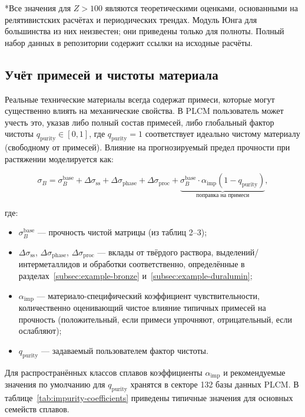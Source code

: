 \documentclass[12pt,a4paper]{article}
\begin{document}
	*Все значения для \(Z>100\) являются теоретическими оценками, основанными на релятивистских расчётах и периодических трендах. Модуль Юнга для большинства из них неизвестен; они приведены только для полноты. Полный набор данных в репозитории содержит ссылки на исходные расчёты.
	
	\subsection{Учёт примесей и чистоты материала}
	\label{subsec:purity}
	
	Реальные технические материалы всегда содержат примеси, которые могут существенно влиять на механические свойства. В PLCM пользователь может учесть это, указав либо полный состав примесей, либо глобальный фактор чистоты \(q_{\mathrm{purity}} \in [0,1]\), где \(q_{\mathrm{purity}}=1\) соответствует идеально чистому материалу (свободному от примесей). Влияние на прогнозируемый предел прочности при растяжении моделируется как:
	
	\[
	\sigma_B = \sigma_B^{\mathrm{base}} + \Delta\sigma_{\mathrm{ss}} + \Delta\sigma_{\mathrm{phase}} + \Delta\sigma_{\mathrm{proc}} + \underbrace{\sigma_B^{\mathrm{base}} \cdot \alpha_{\mathrm{imp}} (1 - q_{\mathrm{purity}})}_{\text{поправка на примеси}},
	\]
	
	где:
	\begin{itemize}
		\item \(\sigma_B^{\mathrm{base}}\) — прочность чистой матрицы (из таблиц 2–3);
		\item \(\Delta\sigma_{\mathrm{ss}}\), \(\Delta\sigma_{\mathrm{phase}}\), \(\Delta\sigma_{\mathrm{proc}}\) — вклады от твёрдого раствора, выделений/интерметаллидов и обработки соответственно, определённые в разделах~\ref{subsec:example-bronze} и~\ref{subsec:example-duralumin};
		\item \(\alpha_{\mathrm{imp}}\) — материало-специфический коэффициент чувствительности, количественно оценивающий чистое влияние типичных примесей на прочность (положительный, если примеси упрочняют, отрицательный, если ослабляют);
		\item \(q_{\mathrm{purity}}\) — задаваемый пользователем фактор чистоты.
	\end{itemize}
	
	Для распространённых классов сплавов коэффициенты \(\alpha_{\mathrm{imp}}\) и рекомендуемые значения по умолчанию для \(q_{\mathrm{purity}}\) хранятся в секторе 132 базы данных PLCM. В таблице~\ref{tab:impurity-coefficients} приведены типичные значения для основных семейств сплавов.
	
\end{document}
